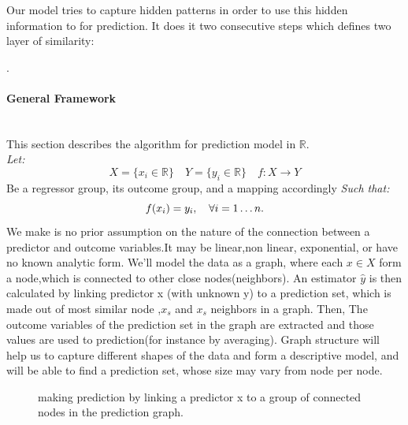 \documentclass[a4paper]{article}
\begin{document}
Our model tries to capture hidden patterns in order to use this hidden information to for prediction.
It does it two consecutive steps which defines two layer of similarity:


.
 
 \pagebreak
 
\paragraph{General Framework}\hspace{0pt}\\
This section describes the  algorithm for prediction model in  $\mathbb{R}$.\\
\emph{Let:}	 \\
\begin{equation}
X=\{x_i\in \mathbb{R} \} \quad
Y=\{y_i\in \mathbb{R} \} \quad
f:X\rightarrow Y
\end{equation}
Be a regressor group,   its outcome group, and a mapping  accordingly
\emph{Such that:} \\ 
\begin{equation}
f(x_i)=y_i,\quad\forall  i=1\dots n .\\
\end{equation}
We make is no prior assumption on the nature of the connection between a predictor and outcome variables.It may be linear,non linear, exponential, or have no known analytic form.
We'll model the data as a graph, where each $x\in X$ form a node,which is connected to other close nodes(neighbors).
An estimator $\hat{y}$ is then calculated by linking predictor x (with unknown y) to 
a prediction set,  which is made out of most similar node ,$x_s$   and  $x_s$ neighbors in a graph. Then, The outcome variables of the prediction set in the graph are extracted and those values are used to prediction(for instance by averaging).
Graph structure will help us to capture different shapes of the data and form a descriptive model, and will be able to find a  prediction set, whose  size may vary from node per node.
\begin{figure}[ht]
\centering
{}
\caption[Optional caption for list of figures]{making prediction by linking a predictor x to a group of connected nodes in the prediction graph. }
\label{fig:subfigureExample}
\end{figure}
\end{document}
